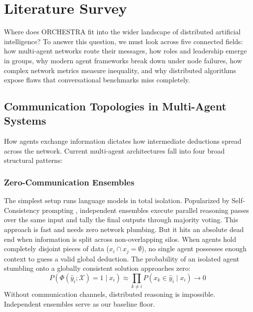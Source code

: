 \documentclass{ieeeaccess}
\begin{document}
\section{Literature Survey}
\label{sec:literature}

Where does ORCHESTRA fit into the wider landscape of distributed artificial intelligence? To answer this question, we must look across five connected fields: how multi-agent networks route their messages, how roles and leadership emerge in groups, why modern agent frameworks break down under node failures, how complex network metrics measure inequality, and why distributed algorithms expose flaws that conversational benchmarks miss completely.

\subsection{Communication Topologies in Multi-Agent Systems}
How agents exchange information dictates how intermediate deductions spread across the network. Current multi-agent architectures fall into four broad structural patterns:

\subsubsection{Zero-Communication Ensembles}
The simplest setup runs language models in total isolation. Popularized by Self-Consistency prompting \cite{wang2023selfconsistency}, independent ensembles execute parallel reasoning passes over the same input and tally the final outputs through majority voting. This approach is fast and needs zero network plumbing. But it hits an absolute dead end when information is split across non-overlapping silos. When agents hold completely disjoint pieces of data ($x_i \cap x_j = \emptyset$), no single agent possesses enough context to guess a valid global deduction. The probability of an isolated agent stumbling onto a globally consistent solution approaches zero:
\begin{equation}
\label{eq:independent_failure}
P(\Phi(\hat{y}_i; \mathcal{X}) = 1 \mid x_i) \approx \prod_{k \neq i} P(x_k \in \hat{y}_i \mid x_i) \to 0
\end{equation}
Without communication channels, distributed reasoning is impossible. Independent ensembles serve as our baseline floor.
\end{document}
